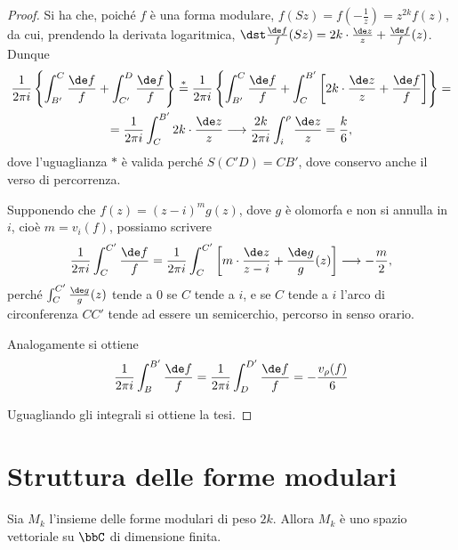 \begin{proof}
	Si ha che, poiché $f$ è una forma modulare, $f(Sz)=f(-\frac{1}{z})=z^{2k}f(z)$, da cui, prendendo la derivata logaritmica,
	$\dst\frac{\de f}{f}(Sz)=2k\cdot\frac{\de z}{z}+\frac{\de f}{f}(z)$. Dunque
	\begin{multline}
		\frac{1}{2\pi i}\left\{ \int_{B'}^C\frac{\de f}{f} + \int_{C'}^D\frac{\de f}{f} \right\} \overset{*}{=} %
		\frac{1}{2\pi i}\left\{ \int_{B'}^C\frac{\de f}{f} + \int_{C}^{B'} \left[2k \cdot \frac{\de z}{z} + \frac{\de f}{f}\right] \right\} = \\
		= \frac{1}{2\pi i}\int_{C}^{B'} 2k \cdot \frac{\de z}{z} \longrightarrow \frac{2k}{2\pi i}\int_i^\rho \frac{\de z}{z} = \frac{k}{6},
	\end{multline}
	dove l'uguaglianza $*$ è valida perché $S(C'D)=CB'$, dove conservo anche il verso di percorrenza.
	
	Supponendo che $f(z)=(z-i)^mg(z)$, dove $g$ è olomorfa e non si annulla in $i$, cioè $m=v_i(f)$, possiamo scrivere
	\begin{equation*}
		\frac{1}{2\pi i}\int_C^{C'}\frac{\de f}{f} = \frac{1}{2\pi i}\int_C^{C'}\left[ m\cdot\frac{\de z}{z-i} + %
		\frac{\de g}{g}(z) \right] \longrightarrow -\frac{m}{2},
	\end{equation*}
	perché $\int_C^{C'}\frac{\de g}{g}(z)$ tende a $0$ se $C$ tende a $i$, e se $C$ tende a $i$ l'arco di circonferenza $CC'$ tende ad essere un semicerchio, percorso in senso orario.
	
	Analogamente si ottiene 
	\begin{equation*}
		\frac{1}{2\pi i}\int_B^{B'}\frac{\de f}{f}=\frac{1}{2\pi i}\int_D^{D'}\frac{\de f}{f}=-\frac{v_\rho(f)}{6}
	\end{equation*}
	
	Uguagliando gli integrali si ottiene la tesi.
\end{proof}

\section{Struttura delle forme modulari}

\begin{corollario}
	Sia $M_k$ l'insieme delle forme modulari di peso $2k$. Allora $M_k$ è uno spazio vettoriale su $\bbC$ di dimensione finita.
\end{corollario}

